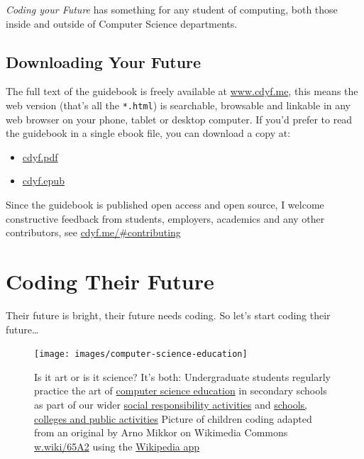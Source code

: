 \documentclass[
  12pt,
]{book}
\providecommand{\tightlist}{%
  \setlength{\itemsep}{0pt}\setlength{\parskip}{0pt}}
\begin{document}
\emph{Coding your Future} has something for any student of computing, both those inside and outside of Computer Science departments. 👨🏿‍💻👨‍💻👩🏽‍💻👩‍💻👩🏿‍💻

\hypertarget{downloading}{%
\section{Downloading Your Future}\label{downloading}}

The full text of the guidebook is freely available at \href{https://www.cdyf.me/}{www.cdyf.me}, this means the web version (that's all the \texttt{*.html}) is searchable, browsable and linkable in any web browser on your phone, tablet or desktop computer. If you'd prefer to read the guidebook in a single ebook file, you can download a copy at:

\begin{itemize}
\tightlist
\item
  \href{https://www.cdyf.me/cdyf.pdf}{cdyf.pdf}
\item
  \href{https://www.cdyf.me/cdyf.epub}{cdyf.epub}
\end{itemize}

Since the guidebook is published open access and open source, I welcome constructive feedback from students, employers, academics and any other contributors, see \href{https://www.cdyf.me/\#contributing}{cdyf.me/\#contributing}

\hypertarget{coding-their-future}{%
\chapter{Coding Their Future}\label{coding-their-future}}

Their future is bright, their future needs coding. So let's start coding their future\ldots{}



\begin{figure}

{\centering \texttt{[image: images/computer-science-education]} 

}

\caption{Is it art or is it science? It's both: Undergraduate students regularly practice the art of \href{https://en.wikipedia.org/wiki/Computer_science_education}{computer science education} in secondary schools as part of our wider \href{https://www.cs.manchester.ac.uk/connect/social-responsibility/}{social responsibility activities} \citep{m2020, m20202} and \href{https://www.cs.manchester.ac.uk/connect/schools-colleges-public/}{schools, colleges and public activities} Picture of children coding adapted from an original by Arno Mikkor on Wikimedia Commons \href{https://w.wiki/65A2}{w.wiki/65A2} using the \href{https://apps.apple.com/us/app/wikipedia/id324715238}{Wikipedia app}}\label{fig:unnamed-chunk-6}
\end{figure}
\end{document}
